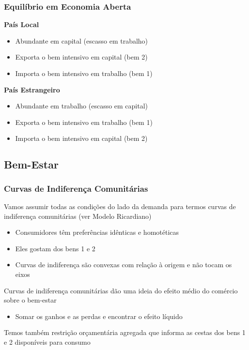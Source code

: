 \documentclass[a4paper,12pt]{article}[abntex2]
\begin{document}
\subsubsection{\textbf{Equilíbrio em Economia Aberta}}
\textbf{País Local}
\begin{itemize}
    \item Abundante em capital (escasso em trabalho)
    \item Exporta o bem intensivo em capital (bem 2)
    \item Importa o bem intensivo em trabalho (bem 1)
\end{itemize}

\textbf{País Estrangeiro}
\begin{itemize}
    \item Abundante em trabalho (escasso em capital)
    \item Exporta o bem intensivo em trabalho (bem 1)
    \item Importa o bem intensivo em capital (bem 2)
\end{itemize}

\subsection{\textbf{Bem-Estar}}
\subsubsection{\textbf{Curvas de Indiferença Comunitárias}}
Vamos assumir todas as condições do lado da demanda para termos curvas de indiferença comunitárias (ver Modelo Ricardiano)\begin{itemize}
    \item Consumidores têm preferências idênticas e homotéticas
    \item Eles gostam dos bens 1 e 2
    \item Curvas de indiferença são convexas com relação à origem e não tocam os eixos
\end{itemize}

Curvas de indiferença comunitárias dão uma ideia do efeito médio do comércio sobre o bem-estar\begin{itemize}
    \item Somar os ganhos e as perdas e encontrar o efeito líquido
\end{itemize}

Temos também restrição orçamentária agregada que informa as cestas dos bens 1 e 2 disponíveis para consumo
\end{document}
